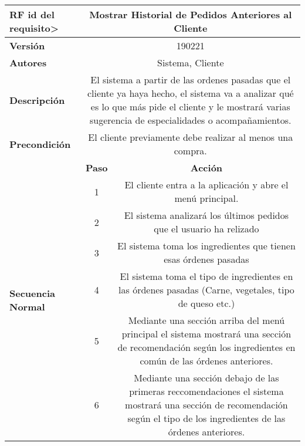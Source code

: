 \documentclass[conference]{IEEEtran}
\begin{document}
\begin{table}[H]
  \centering
  \begin{adjustbox}{width=0.47\textwidth}
    \begin{tabular}{|p{11.215em}|c|c|}
    \toprule
    \textbf{RF id del requisito>} & \multicolumn{2}{p{37.355em}|}{\textbf{Mostrar Historial de Pedidos Anteriores al Cliente}} \\
    \midrule
    \textbf{Versión} & \multicolumn{2}{c|}{190221} \\
    \midrule
    \textbf{Autores} & \multicolumn{2}{p{37.355em}|}{Sistema, Cliente} \\
    \midrule
    \textbf{Descripción} & \multicolumn{2}{p{37.355em}|}{El sistema a partir de las ordenes pasadas que el cliente ya haya hecho, el sistema va a analizar qué es lo que más pide el cliente y le mostrará varias sugerencia de especialidades o acompañamientos.} \\
    \midrule
    \textbf{Precondición} & \multicolumn{2}{p{37.355em}|}{El cliente previamente debe realizar al menos una compra.} \\
    \midrule
    \multirow{9}[16]{*}{\textbf{Secuencia Normal}} & \multicolumn{1}{p{5.355em}|}{\textbf{Paso}} & \multicolumn{1}{p{32em}|}{\textbf{Acción}} \\
\cmidrule{2-3}    \multicolumn{1}{|c|}{} & \multirow{2}[2]{*}{1} & \multicolumn{1}{c|}{\multirow{2}[2]{*}{El cliente entra a la aplicación y abre el menú principal.}} \\
    \multicolumn{1}{|c|}{} &       &  \\
\cmidrule{2-3}    \multicolumn{1}{|c|}{} & 2     & \multicolumn{1}{p{32em}|}{El sistema analizará los últimos pedidos que el usuario ha relizado} \\
\cmidrule{2-3}    \multicolumn{1}{|c|}{} & 3     & \multicolumn{1}{p{32em}|}{El sistema toma los ingredientes que tienen esas órdenes pasadas} \\
\cmidrule{2-3}    \multicolumn{1}{|c|}{} & 4     & \multicolumn{1}{p{32em}|}{El sistema toma el tipo de ingredientes en las órdenes pasadas (Carne, vegetales, tipo de queso etc.)} \\
\cmidrule{2-3}    \multicolumn{1}{|c|}{} & 5     & \multicolumn{1}{p{32em}|}{Mediante una sección arriba del menú principal el sistema mostrará una sección de recomendación según los ingredientes en común de las órdenes anteriores.} \\
\cmidrule{2-3}    \multicolumn{1}{|c|}{} & 6     & \multicolumn{1}{p{32em}|}{Mediante una sección debajo de las primeras reccomendaciones el sistema mostrará una sección de recomendación según el tipo de los ingredientes de las órdenes anteriores.} \\

\end{tabular}
\end{adjustbox}
\end{table}
\end{document}
